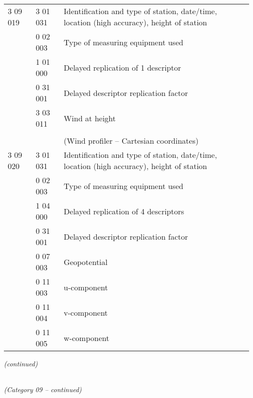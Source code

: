\begin{longtable}[]{@{}llll@{}}
3 09 019 & 3 01 031 & Identification and type of station, date/time, location (high accuracy), height of station &\tabularnewline
& 0 02 003 & Type of measuring equipment used &\tabularnewline
& 1 01 000 & Delayed replication of 1 descriptor &\tabularnewline
& 0 31 001 & Delayed descriptor replication factor &\tabularnewline
& 3 03 011 & Wind at height &\tabularnewline
& & &\tabularnewline
& & (Wind profiler -- Cartesian coordinates) &\tabularnewline
3 09 020 & 3 01 031 & Identification and type of station, date/time, location (high accuracy), height of station &\tabularnewline
& 0 02 003 & Type of measuring equipment used &\tabularnewline
& 1 04 000 & Delayed replication of 4 descriptors &\tabularnewline
& 0 31 001 & Delayed descriptor replication factor &\tabularnewline
& 0 07 003 & Geopotential &\tabularnewline
& 0 11 003 & u-component &\tabularnewline
& 0 11 004 & v-component &\tabularnewline
& 0 11 005 & w-component &\tabularnewline
\bottomrule
\end{longtable}

\emph{(continued)}

\emph{\\
(Category 09 -- continued)}

